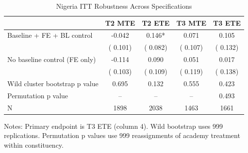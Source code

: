 \begin{table}[!htbp]
\centering
\caption{Nigeria ITT Robustness Across Specifications}
\label{tab:ng_spec_robust}
\begin{threeparttable}
\fontsize{9}{11}\selectfont
\begin{tabular}[t]{lcccc}
\toprule
 & T2 MTE & T2 ETE & T3 MTE & T3 ETE \\
\midrule
Baseline + FE + BL control &  -0.042 &   0.146* &   0.071 &   0.105 \\
 & (  0.101) & (  0.082) & (  0.107) & (  0.132) \\
No baseline control (FE only) &  -0.114 &   0.090 &   0.051 &   0.017 \\
 & (  0.103) & (  0.109) & (  0.119) & (  0.138) \\
\midrule
Wild cluster bootstrap p value & 0.695 & 0.132 & 0.555 & 0.423 \\
Permutation p value & -- & -- & -- & 0.493 \\
\addlinespace
N & 1898 & 2038 & 1463 & 1661 \\
\bottomrule
\end{tabular}
\begin{tablenotes}
\footnotesize
\item Notes: Primary endpoint is T3 ETE (column 4). Wild bootstrap uses 999 replications. Permutation p values use 999 reassignments of academy treatment within constituency.
\end{tablenotes}
\end{threeparttable}
\end{table}
